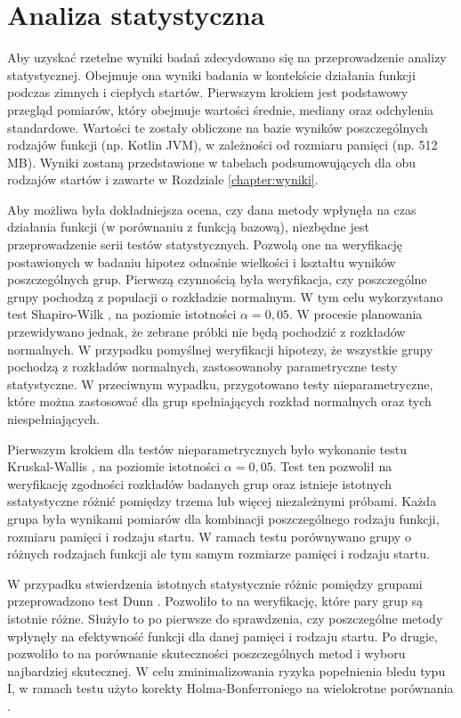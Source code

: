 \section{Analiza statystyczna}\label{chapter:analiza_statystyczna}

Aby uzyskać rzetelne wyniki badań zdecydowano się na przeprowadzenie analizy statystycznej.
Obejmuje ona wyniki badania w kontekście działania funkcji podczas zimnych i ciepłych startów.
Pierwszym krokiem jest podstawowy przegląd pomiarów, który obejmuje wartości średnie, mediany oraz odchylenia standardowe.
Wartości te zostały obliczone na bazie wyników poszczególnych rodzajów funkcji (np. Kotlin JVM), w zależności od rozmiaru pamięci (np. 512 MB).
Wyniki zostaną przedstawione w tabelach podsumowujących dla obu rodzajów startów i zawarte w Rozdziale \ref{chapter:wyniki}.

Aby możliwa była dokładniejsza ocena, czy dana metody wpłynęła na czas działania funkcji (w porównaniu z funkcją bazową), niezbędne jest przeprowadzenie serii testów statystycznych.
Pozwolą one na weryfikację postawionych w badaniu hipotez odnośnie wielkości i kształtu wyników poszczególnych grup.
Pierwszą czynnością była weryfikacja, czy poszczególne grupy pochodzą z populacji o rozkładzie normalnym. 
W tym celu wykorzystano test Shapiro-Wilk \cite{eb32428d-e089-3d0c-8541-5f3e8f273532}, na poziomie istotności $\alpha = 0,05$.
W procesie planowania przewidywano jednak, że zebrane próbki nie będą pochodzić z rozkładów normalnych.
W przypadku pomyślnej weryfikacji hipotezy, że wszystkie grupy pochodzą z rozkładów normalnych, zastosowanoby parametryczne testy statystyczne.
W przeciwnym wypadku, przygotowano testy nieparametryczne, które można zastosować dla grup spełniających rozkład normalnych oraz tych niespełniających.

Pierwszym krokiem dla testów nieparametrycznych było wykonanie testu Kruskal-Wallis \cite{ac6c544c-0197-38bd-8c06-ec4f655ff4fd}, na poziomie istotności $\alpha = 0,05$.
Test ten pozwolił na weryfikację zgodności rozkładów badanych grup oraz istnieje istotnych sstatystyczne różnić pomiędzy trzema lub więcej niezależnymi próbami.
Każda grupa była wynikami pomiarów dla kombinacji poszczególnego rodzaju funkcji, rozmiaru pamięci i rodzaju startu.
W ramach testu porównywano grupy o różnych rodzajach funkcji ale tym samym rozmiarze pamięci i rodzaju startu.

W przypadku stwierdzenia istotnych statystycznie różnic pomiędzy grupami przeprowadzono test Dunn \cite{c3fa9fa7-dd2a-35f2-84a0-d5c07e68dd08}.
Pozwoliło to na weryfikację, które pary grup są istotnie różne.
Służyło to po pierwsze do sprawdzenia, czy poszczególne metody wpłynęły na efektywność funkcji dla danej pamięci i rodzaju startu.
Po drugie, pozwoliło to na porównanie skuteczności poszczególnych metod i wyboru najbardziej skutecznej.
W celu zminimalizowania ryzyka popełnienia bledu typu I, w ramach testu użyto korekty Holma-Bonferroniego na wielokrotne porównania \cite{29def780-e117-38f0-8afb-edf384af3fad}.
